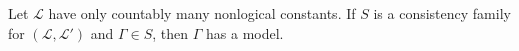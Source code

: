 Let $\mathcal{L}$ have only countably many nonlogical constants. If $S$ is a consistency family for $(\mathcal{L}, \mathcal{L}')$ and $\Gamma \in S$, then $\Gamma$ has a model.
